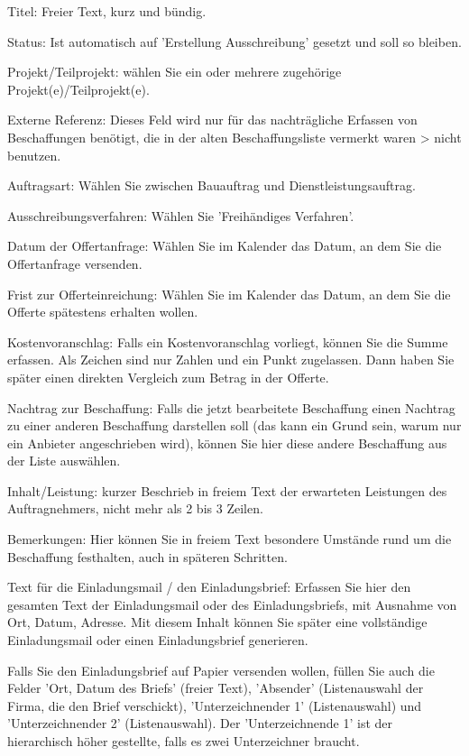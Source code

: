 \begin{compactitem}
\item
Titel: Freier Text, kurz und bündig.
\item
Status: Ist automatisch auf 'Erstellung Ausschreibung' gesetzt und soll so bleiben.
\item
Projekt/Teilprojekt: wählen Sie ein oder mehrere zugehörige Projekt(e)/Teilprojekt(e).
\item
Externe Referenz: Dieses Feld wird nur für das nachträgliche Erfassen von Beschaffungen benötigt, die in der alten Beschaffungsliste vermerkt waren > nicht benutzen.
\item
Auftragsart: Wählen Sie zwischen Bauauftrag und Dienstleistungsauftrag.
\item
Ausschreibungsverfahren: Wählen Sie 'Freihändiges Verfahren'.
\item
Datum der Offertanfrage: Wählen Sie im Kalender das Datum, an dem Sie die Offertanfrage versenden.
\item
Frist zur Offerteinreichung: Wählen Sie im Kalender das Datum, an dem Sie die Offerte spätestens erhalten wollen.
\item
Kostenvoranschlag: Falls ein Kostenvoranschlag vorliegt, können Sie die Summe erfassen. Als Zeichen sind nur Zahlen und ein Punkt zugelassen. Dann haben Sie später einen direkten Vergleich zum Betrag in der Offerte.
\item
Nachtrag zur Beschaffung: Falls die jetzt bearbeitete Beschaffung einen Nachtrag zu einer anderen Beschaffung darstellen soll (das kann ein Grund sein, warum nur ein Anbieter angeschrieben wird), können Sie hier diese andere Beschaffung aus der Liste auswählen.
\item
Inhalt/Leistung: kurzer Beschrieb in freiem Text der erwarteten Leistungen des Auftragnehmers, nicht mehr als 2 bis 3 Zeilen.
\item
Bemerkungen: Hier können Sie in freiem Text besondere Umstände rund um die Beschaffung festhalten, auch in späteren Schritten.
\item
Text für die Einladungsmail / den Einladungsbrief: Erfassen Sie hier den gesamten Text der Einladungsmail oder des Einladungsbriefs, mit Ausnahme von Ort, Datum, Adresse. Mit diesem Inhalt können Sie später eine vollständige Einladungsmail oder einen Einladungsbrief generieren.
\item
Falls Sie den Einladungsbrief auf Papier versenden wollen, füllen Sie auch die Felder 'Ort, Datum des Briefs' (freier Text), 'Absender' (Listenauswahl der Firma, die den Brief verschickt), 'Unterzeichnender 1' (Listenauswahl) und 'Unterzeichnender 2' (Listenauswahl). Der 'Unterzeichnende 1' ist der hierarchisch höher gestellte, falls es zwei Unterzeichner braucht.
\end{compactitem}

